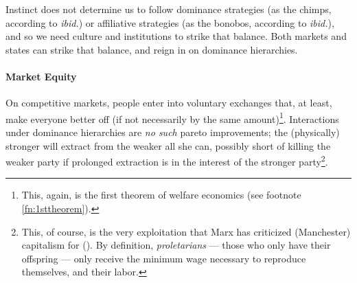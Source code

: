 Instinct does not determine us to follow dominance strategies (as the chimps, according to \emph{ibid.}) or affiliative strategies (as the bonobos, according to \emph{ibid.}), and so we need culture and institutions to strike that balance. Both markets and states can strike that balance, and reign in on dominance hierarchies.

\paragraph{Market Equity}  \label{sec:marketequity} On competitive markets, people enter into voluntary exchanges that, at least, make everyone better off (if not necessarily by the same amount)\footnote{
	This, again, is the first theorem of welfare economics (see footnote \ref{fn:1sttheorem}).}.
Interactions under dominance hierarchies are \emph{no such} pareto improvements; the (physically) stronger will extract from the weaker all she can, possibly short of killing the weaker party if prolonged extraction is in the interest of the stronger party\footnote{
	This, of course, is the very exploitation that Marx has criticized (Manchester) capitalism for (\citeyear{MarxEngels-1848-aa,Marx-1867-aa}). By definition, \emph{proletarians} --- those who only have their offspring --- only receive the minimum wage necessary to reproduce themselves, and their labor.}.

